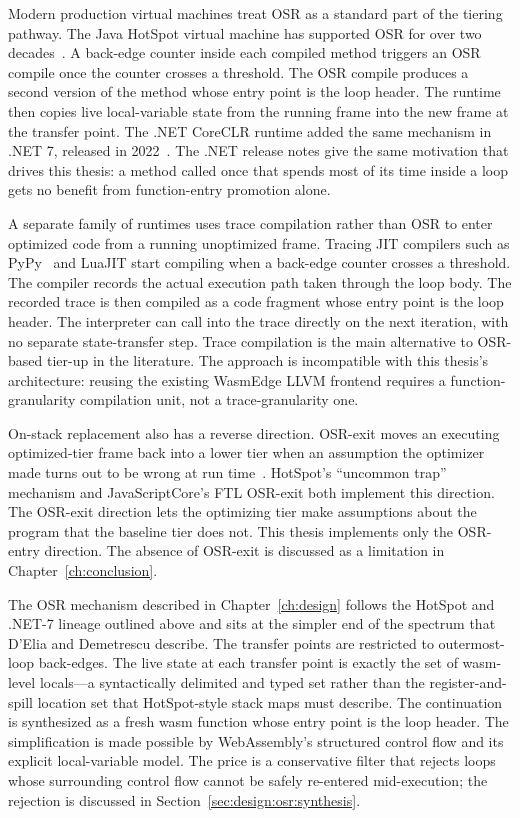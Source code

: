 Modern production virtual machines treat OSR as a standard part of the tiering pathway. The Java HotSpot virtual machine has supported OSR for over two decades~\cite{paleczny2001hotspot}. A back-edge counter inside each compiled method triggers an OSR compile once the counter crosses a threshold. The OSR compile produces a second version of the method whose entry point is the loop header. The runtime then copies live local-variable state from the running frame into the new frame at the transfer point. The .NET CoreCLR runtime added the same mechanism in .NET 7, released in 2022~\cite{dotnet7osr}. The .NET release notes give the same motivation that drives this thesis: a method called once that spends most of its time inside a loop gets no benefit from function-entry promotion alone.

A separate family of runtimes uses trace compilation rather than OSR to enter optimized code from a running unoptimized frame. Tracing JIT compilers such as PyPy~\cite{bolz2009pypy} and LuaJIT start compiling when a back-edge counter crosses a threshold. The compiler records the actual execution path taken through the loop body. The recorded trace is then compiled as a code fragment whose entry point is the loop header. The interpreter can call into the trace directly on the next iteration, with no separate state-transfer step. Trace compilation is the main alternative to OSR-based tier-up in the literature. The approach is incompatible with this thesis's architecture: reusing the existing WasmEdge LLVM frontend requires a function-granularity compilation unit, not a trace-granularity one.

On-stack replacement also has a reverse direction. OSR-exit moves an executing optimized-tier frame back into a lower tier when an assumption the optimizer made turns out to be wrong at run time~\cite{holzle1992deopt}. HotSpot's ``uncommon trap'' mechanism and JavaScriptCore's FTL OSR-exit both implement this direction. The OSR-exit direction lets the optimizing tier make assumptions about the program that the baseline tier does not. This thesis implements only the OSR-entry direction. The absence of OSR-exit is discussed as a limitation in Chapter~\ref{ch:conclusion}.

The OSR mechanism described in Chapter~\ref{ch:design} follows the HotSpot and .NET-7 lineage outlined above and sits at the simpler end of the spectrum that D'Elia and Demetrescu describe. The transfer points are restricted to outermost-loop back-edges. The live state at each transfer point is exactly the set of wasm-level locals---a syntactically delimited and typed set rather than the register-and-spill location set that HotSpot-style stack maps must describe. The continuation is synthesized as a fresh wasm function whose entry point is the loop header. The simplification is made possible by WebAssembly's structured control flow and its explicit local-variable model. The price is a conservative filter that rejects loops whose surrounding control flow cannot be safely re-entered mid-execution; the rejection is discussed in Section~\ref{sec:design:osr:synthesis}.


